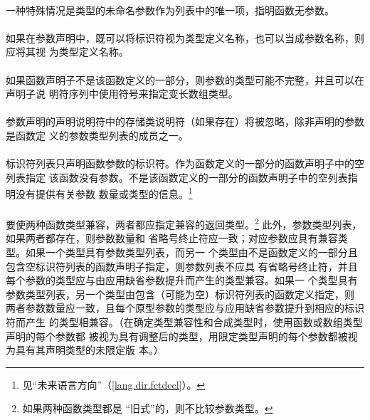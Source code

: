 {\paragraph{}
一种特殊情况是类型的未命名参数作为列表中的唯一项，指明函数无参数。

\paragraph{}
如果在参数声明中，既可以将标识符视为类型定义名称，也可以当成参数名称，则应将其视
为类型定义名称。

\paragraph{}
如果函数声明子不是该函数定义的一部分，则参数的类型可能不完整，并且可以在声明子说
明符序列中使用\tm{[*]}符号来指定变长数组类型。

\paragraph{}
参数声明的声明说明符中的存储类说明符（如果存在）将被忽略，除非声明的参数是函数定
义的参数类型列表的成员之一。

\paragraph{}
标识符列表只声明函数参数的标识符。作为函数定义的一部分的函数声明子中的空列表指定
该函数没有参数。不是该函数定义的一部分的函数声明子中的空列表指明没有提供有关参数
数量或类型的信息。\footnote{见``未来语言方向''（\ref{lang.dir.fctdecl}）。}

\paragraph{}
要使两种函数类型兼容，两者都应指定兼容的返回类型。\footnote{如果两种函数类型都是
``旧式''的，则不比较参数类型。} 此外，参数类型列表，如果两者都存在，则参数数量和
省略号终止符应一致；对应参数应具有兼容类型。如果一个类型具有参数类型列表，而另一
个类型由不是函数定义的一部分且包含空标识符列表的函数声明子指定，则参数列表不应具
有省略号终止符，并且每个参数的类型应与由应用缺省参数提升而产生的类型兼容。如果一
个类型具有参数类型列表，另一个类型由包含（可能为空）标识符列表的函数定义指定，则
两者参数数量应一致，且每个原型参数的类型应与应用缺省参数提升到相应的标识符而产生
的类型相兼容。（在确定类型兼容性和合成类型时，使用函数或数组类型声明的每个参数都
被视为具有调整后的类型，用限定类型声明的每个参数都被视为具有其声明类型的未限定版
本。）

}
